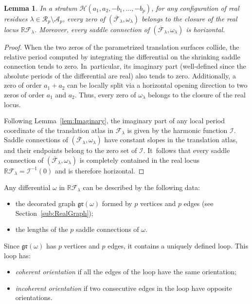 \documentclass[11pt]{article}
\newtheorem{lem}[thm]{Lemma}
\theoremstyle{definition}
\begin{document}
\begin{lem}\label{lem:RealLocus}
In a stratum $\mathcal{H}(a_{1},a_{2},-b_{1},\dots,-b_{p})$, for any configuration of real residues $\lambda\in \mathcal{R}_p\setminus\mathcal{A}_{p}$, every zero of $(\overline{\mathcal{F}}_{\lambda},\omega_{\lambda})$ belongs to the closure of the real locus $\mathbb{R}\mathcal{F}_{\lambda}$. Moreover, every saddle connection of $(\overline{\mathcal{F}}_{\lambda},\omega_{\lambda})$ is horizontal.
\end{lem}

\begin{proof}
When the two zeros of the parametrized translation surfaces collide, the relative period computed by integrating the differential on the shrinking saddle connection tends to zero. In~particular, its imaginary part (well-defined since the absolute periods of the differential are real) also tends to zero. Additionally, a zero of order $a_1+a_2$ can be locally split via a horizontal opening direction to two zeros of order $a_1$ and $a_2$. Thus, every zero of $\omega_{\lambda}$ belongs to the closure of the real locus.

Following Lemma~\ref{lem:Imaginary}, the imaginary part of any local period coordinate of the translation atlas in $\mathcal{F}_{\lambda}$ is given by the harmonic function $\mathcal{I}$. Saddle connections of $(\overline{\mathcal{F}}_{\lambda},\omega_{\lambda})$ have constant slopes in the translation atlas, and their endpoints belong to the zero set of $\mathcal{I}$. It~follows that every saddle connection of $(\overline{\mathcal{F}}_{\lambda},\omega_{\lambda})$ is completely contained in the real locus $\mathbb{R}\mathcal{F}_{\lambda} = \mathcal{I}^{-1}(0)$ and is therefore horizontal.
\end{proof}

Any differential $\omega$ in $\mathbb{R}\mathcal{F}_{\lambda}$ can be described by the following data:
\begin{itemize}
\item the decorated graph $\mathfrak{gr}(\omega)$ formed by $p$ vertices and $p$ edges (see Section~\ref{sub:RealGraph});
\item the lengths of the $p$ saddle connections of $\omega$.
\end{itemize}

Since $\mathfrak{gr}(\omega)$ has $p$ vertices and $p$ edges, it contains a uniquely defined loop. This loop has:
\begin{itemize}
\item \textit{coherent orientation} if all the edges of the loop have the same orientation;
\item \textit{incoherent orientation} if two consecutive edges in the loop have opposite orientations.
\end{itemize}
\end{document}
